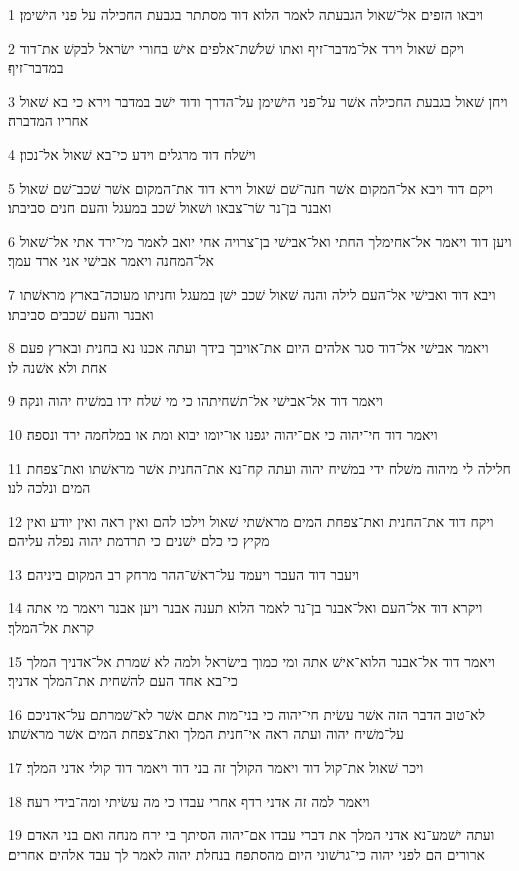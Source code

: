 \par 1 ויבאו הזפים אל־שׁאול הגבעתה לאמר הלוא דוד מסתתר בגבעת החכילה על פני הישׁימן׃
\par 2 ויקם שׁאול וירד אל־מדבר־זיף ואתו שׁלשׁת־אלפים אישׁ בחורי ישׂראל לבקשׁ את־דוד במדבר־זיף׃
\par 3 ויחן שׁאול בגבעת החכילה אשׁר על־פני הישׁימן על־הדרך ודוד ישׁב במדבר וירא כי בא שׁאול אחריו המדברה׃
\par 4 וישׁלח דוד מרגלים וידע כי־בא שׁאול אל־נכון׃
\par 5 ויקם דוד ויבא אל־המקום אשׁר חנה־שׁם שׁאול וירא דוד את־המקום אשׁר שׁכב־שׁם שׁאול ואבנר בן־נר שׂר־צבאו ושׁאול שׁכב במעגל והעם חנים סביבתו׃
\par 6 ויען דוד ויאמר אל־אחימלך החתי ואל־אבישׁי בן־צרויה אחי יואב לאמר מי־ירד אתי אל־שׁאול אל־המחנה ויאמר אבישׁי אני ארד עמך׃
\par 7 ויבא דוד ואבישׁי אל־העם לילה והנה שׁאול שׁכב ישׁן במעגל וחניתו מעוכה־בארץ מראשׁתו ואבנר והעם שׁכבים סביבתו׃
\par 8 ויאמר אבישׁי אל־דוד סגר אלהים היום את־אויבך בידך ועתה אכנו נא בחנית ובארץ פעם אחת ולא אשׁנה לו׃
\par 9 ויאמר דוד אל־אבישׁי אל־תשׁחיתהו כי מי שׁלח ידו במשׁיח יהוה ונקה׃
\par 10 ויאמר דוד חי־יהוה כי אם־יהוה יגפנו או־יומו יבוא ומת או במלחמה ירד ונספה׃
\par 11 חלילה לי מיהוה משׁלח ידי במשׁיח יהוה ועתה קח־נא את־החנית אשׁר מראשׁתו ואת־צפחת המים ונלכה לנו׃
\par 12 ויקח דוד את־החנית ואת־צפחת המים מראשׁתי שׁאול וילכו להם ואין ראה ואין יודע ואין מקיץ כי כלם ישׁנים כי תרדמת יהוה נפלה עליהם׃
\par 13 ויעבר דוד העבר ויעמד על־ראשׁ־ההר מרחק רב המקום ביניהם׃
\par 14 ויקרא דוד אל־העם ואל־אבנר בן־נר לאמר הלוא תענה אבנר ויען אבנר ויאמר מי אתה קראת אל־המלך׃
\par 15 ויאמר דוד אל־אבנר הלוא־אישׁ אתה ומי כמוך בישׂראל ולמה לא שׁמרת אל־אדניך המלך כי־בא אחד העם להשׁחית את־המלך אדניך׃
\par 16 לא־טוב הדבר הזה אשׁר עשׂית חי־יהוה כי בני־מות אתם אשׁר לא־שׁמרתם על־אדניכם על־משׁיח יהוה ועתה ראה אי־חנית המלך ואת־צפחת המים אשׁר מראשׁתו׃
\par 17 ויכר שׁאול את־קול דוד ויאמר הקולך זה בני דוד ויאמר דוד קולי אדני המלך׃
\par 18 ויאמר למה זה אדני רדף אחרי עבדו כי מה עשׂיתי ומה־בידי רעה׃
\par 19 ועתה ישׁמע־נא אדני המלך את דברי עבדו אם־יהוה הסיתך בי ירח מנחה ואם בני האדם ארורים הם לפני יהוה כי־גרשׁוני היום מהסתפח בנחלת יהוה לאמר לך עבד אלהים אחרים׃
